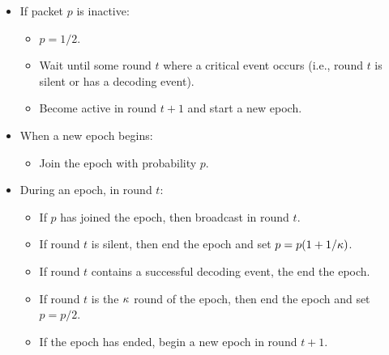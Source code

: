 \begin{itemize}
    \item If packet $p$ is inactive:
    \begin{itemize}
        \item $p = 1/2$.
        \item Wait until some round $t$ where a critical event occurs (i.e., round $t$ is silent or has a decoding event).
        \item Become active in round $t+1$ and start a new epoch.
    \end{itemize}
    \item When a new epoch begins:
    \begin{itemize}
        \item Join the epoch with probability $p$.
    \end{itemize}
    \item During an epoch, in round $t$:
    \begin{itemize}
        \item If $p$ has joined the epoch, then broadcast in round $t$.
        \item If round $t$ is silent, then end the epoch and set $p = p(1 + 1/\kappa)$.
        \item If round $t$ contains a successful decoding event, the end the epoch.
        \item If round $t$ is the $\kappa$ round of the epoch, then end the epoch and set $p = p/2$.
        \item If the epoch has ended, begin a new epoch in round $t+1$.
    \end{itemize}
\end{itemize}

